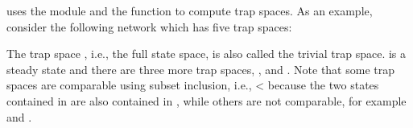 \documentclass[letterpaper,10pt,english]{sphinxmanual}
\begin{document}
 uses the module {\hyperref[\detokenize{AspSolver:aspsolver}]{}} and the function {\hyperref[\detokenize{AspSolver:trap-spaces}]{}} to compute trap spaces.
As an example, consider the following network which has five trap spaces:

\begin{sphinxVerbatim}[commandchars=\\\{\}]
  \PYG{p}{[}
        
        \PYG{p}{]}
  
  
   
     
\end{sphinxVerbatim}

The trap space \sphinxcode{-{-}-}, i.e., the full state space, is also called the trivial trap space.
 is a steady state and there are three more trap spaces, ,  and .
Note that some trap spaces are comparable using subset inclusion, i.e.,
 \textless{}  because the two states contained in  are also contained in ,
while others are not comparable, for example  and .
\end{document}
